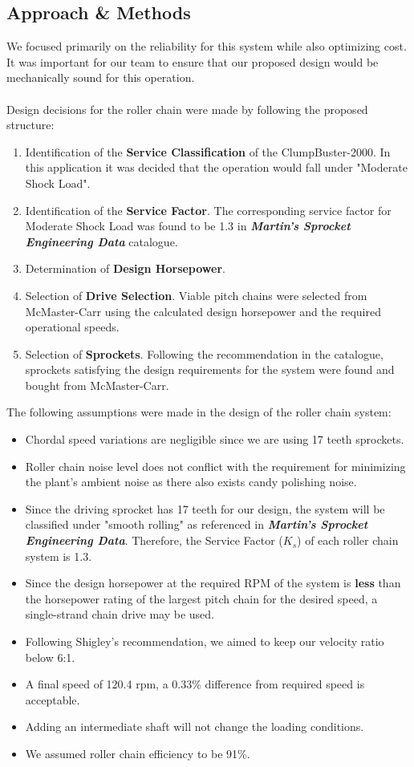 \documentclass[letterpaper,12pt]{article}
\begin{document}
\subsection{Approach \& Methods}
We focused primarily on the reliability for this system while also optimizing cost. It was important for our team to ensure that our proposed design would be mechanically sound for this operation. \\\\
Design decisions for the roller chain were made by following the proposed structure:
\begin{enumerate}
    \itemsep0em
    \item Identification of the \textbf{Service Classification} of the ClumpBuster-2000. In this application it was decided that the operation would fall under "Moderate Shock Load".
    \item Identification of the \textbf{Service Factor}. The corresponding service factor for Moderate Shock Load was found to be 1.3 in \textbf{\textit{Martin's Sprocket Engineering Data}} catalogue. 
    \item Determination of \textbf{Design Horsepower}.
    \item Selection of \textbf{Drive Selection}. Viable pitch chains were selected from McMaster-Carr using the calculated design horsepower and the required operational speeds.
    \item Selection of \textbf{Sprockets}. Following the recommendation in the catalogue, sprockets satisfying the design requirements for the system were found and bought from McMaster-Carr.
\end{enumerate}

\noindent The following assumptions were made in the design of the roller chain system:
\begin{itemize}
    \itemsep0em
    \item Chordal speed variations are negligible since we are using 17 teeth sprockets.
    \item Roller chain noise level does not conflict with the requirement for minimizing the plant's ambient noise as there also exists candy polishing noise.
    \item Since the driving sprocket has 17 teeth for our design, the system will be classified under "smooth rolling" as referenced in \textbf{\textit{Martin's Sprocket Engineering Data}}. Therefore, the Service Factor ($K_s$) of each roller chain system is 1.3.
    \item Since the design horsepower at the required RPM of the system is \textbf{less} than the horsepower rating of the largest pitch chain for the desired speed, a single-strand chain drive may be used.
    \item Following Shigley's recommendation, we aimed to keep our velocity ratio below 6:1.
    \item A final speed of 120.4 rpm, a 0.33\% difference from required speed is acceptable.
    \item Adding an intermediate shaft will not change the loading conditions.
    \item We assumed roller chain efficiency to be 91\%.
\end{itemize}
\end{document}
